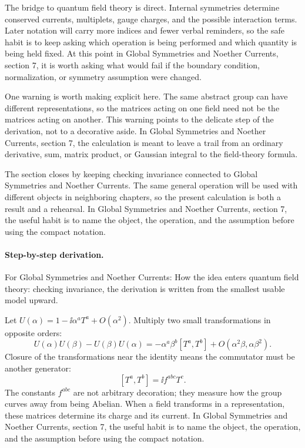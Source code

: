 The bridge to quantum field theory is direct.  Internal symmetries determine conserved currents, multiplets, gauge charges, and the possible interaction terms.  Later notation will carry more indices and fewer verbal reminders, so the safe habit is to keep asking which operation is being performed and which quantity is being held fixed.  At this point in Global Symmetries and Noether Currents, section 7, it is worth asking what would fail if the boundary condition, normalization, or symmetry assumption were changed.

One warning is worth making explicit here.  The same abstract group can have different representations, so the matrices acting on one field need not be the matrices acting on another.  This warning points to the delicate step of the derivation, not to a decorative aside.  In Global Symmetries and Noether Currents, section 7, the calculation is meant to leave a trail from an ordinary derivative, sum, matrix product, or Gaussian integral to the field-theory formula.

The section closes by keeping checking invariance connected to Global Symmetries and Noether Currents.  The same general operation will be used with different objects in neighboring chapters, so the present calculation is both a result and a rehearsal.  In Global Symmetries and Noether Currents, section 7, the useful habit is to name the object, the operation, and the assumption before using the compact notation.



\paragraph{Step-by-step derivation.}

For Global Symmetries and Noether Currents: How the idea enters quantum field theory: checking invariance, the derivation is written from the smallest usable model upward.

Let \(U(\alpha)=1-\ii\alpha^aT^a+O(\alpha^2)\).  Multiply two small transformations in opposite orders:
\[
  U(\alpha)U(\beta)-U(\beta)U(\alpha)
  =
  -\alpha^a\beta^b[T^a,T^b]+O(\alpha^2\beta,\alpha\beta^2).
\]
Closure of the transformations near the identity means the commutator must be another generator:
\[
  [T^a,T^b]=\ii f^{abc}T^c.
\]
The constants \(f^{abc}\) are not arbitrary decoration; they measure how the group curves away from being Abelian.  When a field transforms in a representation, these matrices determine its charge and its current.  In Global Symmetries and Noether Currents, section 7, the useful habit is to name the object, the operation, and the assumption before using the compact notation.

